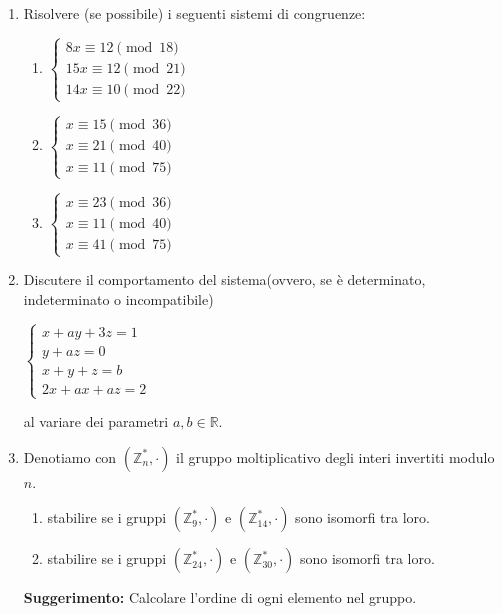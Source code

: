 \documentclass[fleqn]{article}
\begin{document}
\begin{enumerate}
   \item Risolvere (se possibile) i seguenti sistemi di congruenze:
   
   \begin{enumerate} 
      \item \begin{center} 
      $ \begin{cases}
         8x \equiv 12 \pmod{18} \\
         15x \equiv 12 \pmod{21} \\
         14x \equiv 10 \pmod{22} 
      \end{cases} $
      \end{center}
      \item \begin{center} 
      $ \begin{cases}
         x \equiv 15 \pmod{36} \\
         x \equiv 21 \pmod{40} \\
         x \equiv 11 \pmod{75} 
      \end{cases} $
      \end{center}
      \item \begin{center}
      $ \begin{cases}
         x \equiv 23 \pmod{36} \\
         x \equiv 11 \pmod{40} \\
         x \equiv 41 \pmod{75} 
      \end{cases} $
      \end{center}
   \end{enumerate}

   \item Discutere il comportamento del sistema(ovvero, se è determinato, indeterminato o incompatibile)
   \begin{center}
   $\begin{cases} 
      x + ay + 3z = 1 \\
      y + az = 0 \\
      x + y + z = b \\
      2x + ax + az = 2
   \end{cases}$ \\
   \end{center}
   al variare dei parametri $a,b \in \mathbb{R}$.
   \item Denotiamo con $(\mathbb{Z}_n^*, \cdot)$ il gruppo moltiplicativo degli interi invertiti modulo $n$.
   \begin{enumerate}
    \item stabilire se i gruppi $(\mathbb{Z}_9^*, \cdot)$ e $(\mathbb{Z}_{14}^*, \cdot)$ sono isomorfi tra loro.
    \item stabilire se i gruppi $(\mathbb{Z}_{24}^*, \cdot)$ e $(\mathbb{Z}_{30}^*, \cdot)$ sono isomorfi tra loro.
   \end{enumerate}   
   \textbf{Suggerimento:} Calcolare l'ordine di ogni elemento nel gruppo.


\end{enumerate}
\end{document}
